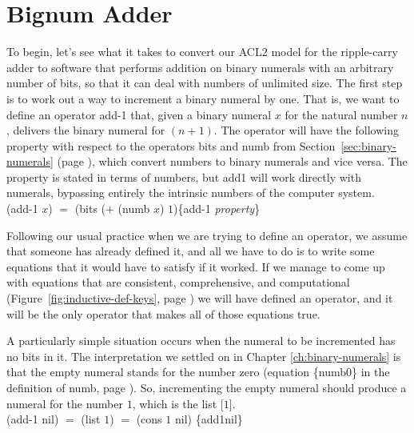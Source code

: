 \section{Bignum Adder}
\label{sec:bignum-adder}

To begin, let's see what it takes to convert our ACL2 model for
the ripple-carry adder to software that performs addition on
binary numerals with an arbitrary number of bits,
so that it can deal with numbers of unlimited size.
The first step is to work out a way to increment a
binary numeral by one.
That is,
we want to define an operator \textsf{add-1} that, given a
binary numeral $x$ for the natural number $n$, delivers the
binary numeral for $(n+1)$.
The operator will have the following
property with respect to the operators \textsf{bits} and \textsf{numb} from
Section~\ref{sec:binary-numerals} (page \pageref{bits-defun}),
which convert numbers to binary numerals and vice versa.
The property is stated in terms of numbers,
but \textsf{add1} will work directly with numerals,
bypassing entirely the intrinsic numbers of the computer system.
\\
\vspace{2mm}
\hspace*{2cm}
\textsf{(add-1 $x$)} $=$ \textsf{(bits ($+$ (numb $x$) $1$)}\hfill\{add-1 \emph{property}\}

Following our usual practice when we are trying to define an operator,
we assume that someone has already defined it,
and all we have to do is to write some equations that it
would have to satisfy if it worked. If we manage
to come up with equations that are consistent, comprehensive, and computational
(Figure~\ref{fig:inductive-def-keys}, page \pageref{fig:inductive-def-keys})
we will have defined an operator,
and it will be the only operator that makes all of those equations true.

A particularly simple situation occurs when the numeral to be incremented
has no bits in it. The interpretation we settled on
in Chapter \ref{ch:binary-numerals} is that
the empty numeral stands for the number zero
(equation \{numb0\} in the definition of \textsf{numb}, page \pageref{nmb-defun}).
So, incrementing the empty numeral should produce a numeral for the number $1$,
which is the list \textsf{[$1$]}.
\\
\vspace{2mm}
\hspace*{2cm}
\textsf{(add-1 nil)} $=$ \textsf{(list $1$)} $=$ \textsf{(cons $1$ nil)}  \hfill \{add1nil\}


